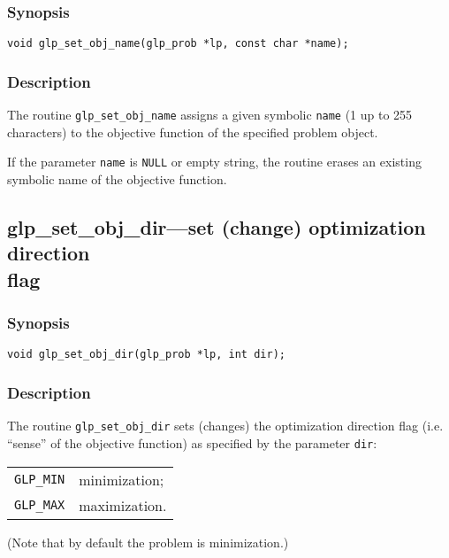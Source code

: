 \subsubsection*{Synopsis}

\begin{verbatim}
void glp_set_obj_name(glp_prob *lp, const char *name);
\end{verbatim}

\subsubsection*{Description}

The routine \verb|glp_set_obj_name| assigns a given symbolic
\verb|name| (1 up to 255 characters) to the objective function of the
specified problem object.

If the parameter \verb|name| is \verb|NULL| or empty string, the routine
erases an existing symbolic name of the objective function.

\subsection{glp\_set\_obj\_dir---set (change) optimization direction\\
flag}

\subsubsection*{Synopsis}

\begin{verbatim}
void glp_set_obj_dir(glp_prob *lp, int dir);
\end{verbatim}

\subsubsection*{Description}

The routine \verb|glp_set_obj_dir| sets (changes) the optimization
direction flag (i.e. ``sense'' of the objective function) as specified
by the parameter \verb|dir|:

\begin{tabular}{@{}ll}
\verb|GLP_MIN| & minimization; \\
\verb|GLP_MAX| & maximization. \\
\end{tabular}

\noindent
(Note that by default the problem is minimization.)

